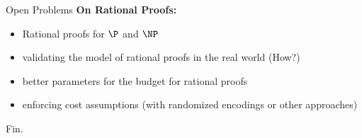 \begin{frame}{Open Problems}
	\textbf{On Rational Proofs:}
	\begin{itemize}[<+- |  alert@+>]
		\item Rational proofs for $\P$ and $\NP$
		\item validating the model of rational proofs in the real world (How?)
		\item better parameters for the budget for rational proofs 
		\item enforcing cost assumptions (with randomized encodings or other approaches)
	\end{itemize}
	
\end{frame}

\begin{frame}{}
	\Large Fin.
\end{frame}

